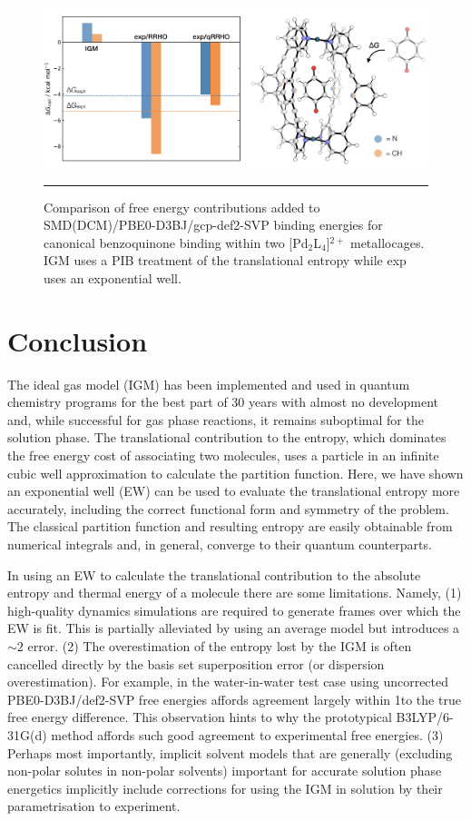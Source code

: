 \documentclass[../main.tex]{subfiles}
\begin{document}
\vspace{0.4cm}
\begin{figure}[h!]
	\centering
	\includegraphics[width=\textwidth]{4/figs/figX12/figX12}
	\vspace{0.2cm}
	\hrule
	\caption{Comparison of free energy contributions added to SMD(DCM)/PBE0-D3BJ/gcp-def2-SVP binding energies for canonical benzoquinone binding within two [Pd$_2$L$_4$]${}^{2+}$ metallocages. IGM uses a PIB treatment of the translational entropy while exp uses an exponential well.} 
	\label{fig::entropy_X12}
\end{figure}


\clearpage
\section{Conclusion}

The ideal gas model (IGM) has been implemented and used in quantum chemistry programs for the best part of 30 years with almost no development and, while successful for gas phase reactions, it remains suboptimal for the solution phase. The translational contribution to the entropy, which dominates the free energy cost of associating two molecules, uses a particle in an infinite cubic well approximation to calculate the partition function. Here, we have shown an exponential well (EW) can be used to evaluate the translational entropy more accurately, including the correct functional form and symmetry of the problem. The classical partition function and resulting entropy are easily obtainable from numerical integrals and, in general, converge to their quantum counterparts. 

In using an EW to calculate the translational contribution to the absolute entropy and thermal energy of a molecule there are some limitations. Namely, (1) high-quality dynamics simulations are required to generate frames over which the EW is fit. This is partially alleviated by using an average model but introduces a $\sim 2$ \kcalx error. (2) The overestimation of the entropy lost by the IGM is often cancelled directly by the basis set superposition error (or dispersion overestimation). For example, in the water-in-water test case using uncorrected PBE0-D3BJ/def2-SVP free energies affords agreement largely within 1\kcalx to the true free energy difference. This observation hints to why the prototypical B3LYP/6-31G(d) method affords such good agreement to experimental free energies. (3) Perhaps most importantly, implicit solvent models that are generally (excluding non-polar solutes in non-polar solvents) important for accurate solution phase energetics implicitly include corrections for using the IGM in solution by their parametrisation to experiment.
\end{document}
